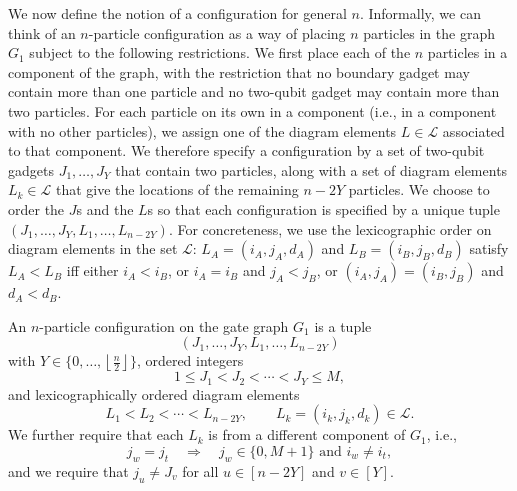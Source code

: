\documentclass[../thesis-main/thesis-main]{subfiles}
\begin{document}
We now define the notion of a configuration for general $n$. Informally, we can think of an $n$-particle configuration as a way of placing $n$ particles in the graph $G_{1}$ subject to the following restrictions. We first place each of the $n$ particles in a component of the graph, with the restriction that no boundary gadget may contain more than one particle and no two-qubit gadget may contain more than two particles. For each particle on its own in a component (i.e., in a component with no other particles), we assign one of the diagram elements $L\in\mathcal{L}$ associated to that component. We therefore specify a configuration by a set of two-qubit gadgets $J_{1},\ldots,J_{Y}$ that contain two particles, along with a set of diagram elements $L_{k}\in\mathcal{L}$ that give the locations of the remaining $n-2Y$ particles. We choose to order the $J$s and the $L$s so that each configuration is specified by a unique tuple $(J_{1},\ldots,J_{Y},L_{1},\ldots,L_{n-2Y})$. For concreteness, we use the lexicographic order on diagram elements in the set $\mathcal{L}$: $L_{A}=(i_{A},j_{A},d_{A})$ and $L_{B}=(i_{B},j_{B},d_{B})$ satisfy $L_{A}<L_{B}$ iff either $i_{A}<i_{B}$, or $i_{A}=i_{B}$ and $j_{A}<j_{B}$, or $(i_{A},j_{A})=(i_{B},j_{B})$ and $d_{A}<d_{B}$.

\begin{definition}
\label{defn:configuration}An $n$-particle configuration on the gate graph $G_{1}$ is a tuple 
\begin{equation}
(J_{1},\ldots,J_{Y},L_{1},\ldots,L_{n-2Y})
\end{equation}
with $Y\in\{0,\ldots,\left\lfloor \frac{n}{2}\right\rfloor \}$, ordered integers
\begin{equation}
1\leq J_{1}<J_{2}<\cdots<J_{Y}\leq M,
\end{equation}
and lexicographically ordered diagram elements 
\begin{equation}
L_{1}<L_{2}<\cdots<L_{n-2Y},\qquad L_{k}=\left(i_{k},j_{k},d_{k}\right)\in\mathcal{L}.
\end{equation}
We further require that each $L_{k}$ is from a different component of $G_{1}$, i.e., 
\begin{equation}
j_{w}=j_{t}\quad\Longrightarrow\quad j_{w}\in\{0,M+1\}\text{ and }i_{w}\neq i_{t},
\end{equation}
and we require that $j_{u}\neq J_{v}$ for all $u\in[n-2Y]$ and $v\in[Y]$.
\end{definition}
\end{document}
